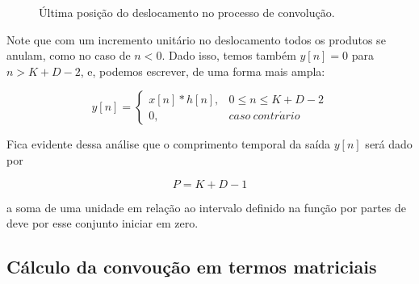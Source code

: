 \documentclass[x11names,a4paper,12pt]{article}
\begin{document}
\begin{figure}[H]
  \centering
  \caption{Última posição do deslocamento no processo de convolução.}
  \label{fig:end_convolution}
\end{figure}

Note que com um incremento unitário no deslocamento todos os produtos se anulam, como no caso de $n<0$. Dado isso, temos também $y[n]=0$ para $n>K+D-2$, e, podemos escrever, de uma forma mais ampla:

\begin{equation}
  y[n] =
  \begin{cases}
    x[n]*h[n], & 0 \leq n \leq K+D-2\\
    0        , & caso\ contr\acute{a}rio
  \end{cases}
\end{equation}

Fica evidente dessa análise que o comprimento temporal da saída $y[n]$ será dado por

\begin{equation}
  P=K+D-1
\end{equation}

a soma de uma unidade em relação ao intervalo definido na função por partes de deve por esse conjunto iniciar em zero.

\subsection{Cálculo da convoução em termos matriciais}
\end{document}
